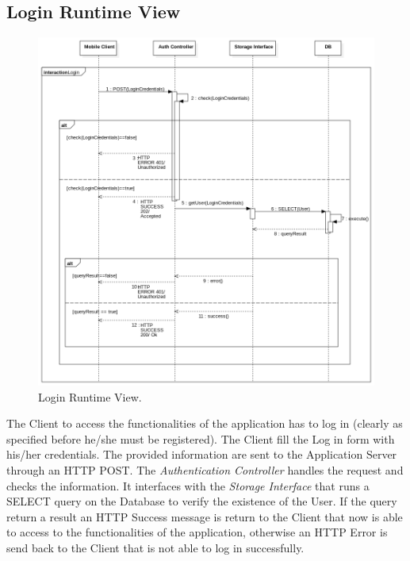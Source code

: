\documentclass{report}
\begin{document}
\subsection{Login Runtime View}
\begin{figure}[H]
	\begin{center}
	\includegraphics[width=\textwidth]{img/Login1.png}
    \end{center}
    \label{fig:LoginSD}
	\caption{Login Runtime View.}
\end{figure}
The Client to access the functionalities of the application has to log in (clearly as specified before he/she must be registered). The Client fill the Log in form with his/her credentials. The provided information are sent to the Application Server through an HTTP POST. The \textit{Authentication Controller} handles the request and checks the information. It interfaces with the \textit{Storage Interface} that runs a SELECT query on the Database to verify the existence of the User. If the query return a result an HTTP Success message is return to the Client that now is able to access to the functionalities of the application, otherwise an HTTP Error is send back to the Client that is not able to log in successfully.
\end{document}
